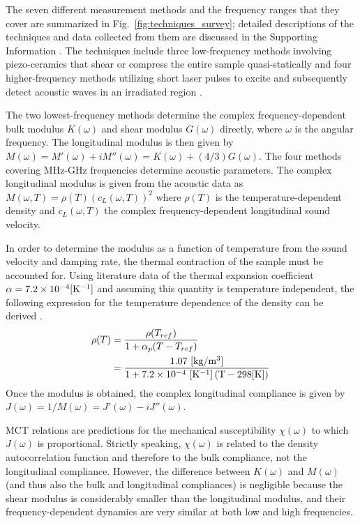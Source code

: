 \documentclass[reprint,showpacs,amsmath,amssymb,aip,jcp]{revtex4-1}
\begin{document}
The seven different measurement methods and the frequency ranges that
they cover are summarized in Fig.~\ref{fig:techniques_survey};
detailed descriptions of the techniques and data collected from them
are discussed in the Supporting Information \cite{Supplementary}. The
techniques include three low-frequency methods involving
piezo-ceramics that shear or compress the entire sample
quasi-statically \cite{Hecksher2013, Christensen1994b,
  Christensen1995, Hecksher_thesis} and four higher-frequency methods
utilizing short laser pulses to excite and subsequently detect
acoustic waves in an irradiated region \cite{Johnson_thesis, Yan1987b,
  Silence1992, Torchinsky_thesis, Thomsen1986, Klieber_thesis,
  Choi2005}.

The two lowest-frequency methods determine the complex
frequency-dependent bulk modulus $K(\omega)$ and shear modulus
$G(\omega)$ directly, where $\omega$ is the angular frequency. The
longitudinal modulus is then given by $M(\omega) = M'(\omega) +
iM''(\omega) = K(\omega) + (4/3)G(\omega)$. The four methods covering
MHz-GHz frequencies determine acoustic parameters. The complex
longitudinal modulus is given from the acoustic data as $M(\omega, T)
= \rho(T)(c_{L}(\omega, T))^2$ where $\rho(T)$ is the
temperature-dependent density and $c_{L}(\omega, T)$ the complex
frequency-dependent longitudinal sound velocity.



In order to determine the modulus as a function of temperature from
the sound velocity and damping rate, the thermal contraction of the
sample must be accounted for. Using literature data of the thermal
expansion coefficient $\alpha = 7.2\times
10^{-4}[\rm{K}^{-1}]$\cite{Orcutt1973,Poulter1979} and assuming this
quantity is temperature independent, the following expression for the
temperature dependence of the density can be derived
\cite{Klieber2013}.
\begin{equation}
  \begin{split}
    \rho(T) & = \frac{\rho(T_{ref})}{1+\alpha_p(T-T_{ref})} \\
    & = \frac{1.07~[{\rm kg/m^3}]}{1 + 7.2 \times 10^{-4}~[
      \rm{K}^{-1}]\left(T - 298[{\rm K}] \right)} \,
  \end{split}
\end{equation}
Once the modulus is obtained, the complex longitudinal compliance is
given by $J(\omega) = 1/M(\omega) = J'(\omega) - iJ''(\omega)$.


MCT relations are predictions for the mechanical susceptibility
$\chi(\omega)$ to which $J(\omega)$ is proportional. Strictly
speaking, $\chi(\omega)$ is related to the density autocorrelation
function and therefore to the bulk compliance, not the longitudinal
compliance. However, the difference between $K(\omega)$ and
$M(\omega)$ (and thus also the bulk and longitudinal compliances) is
negligible because the shear modulus is considerably smaller than the
longitudinal modulus, and their frequency-dependent dynamics are very
similar at both low \cite{Hecksher2013,Christensen1994,
  Gundermann2014} and high \cite{Torchinsky2012} frequencies.
\end{document}
